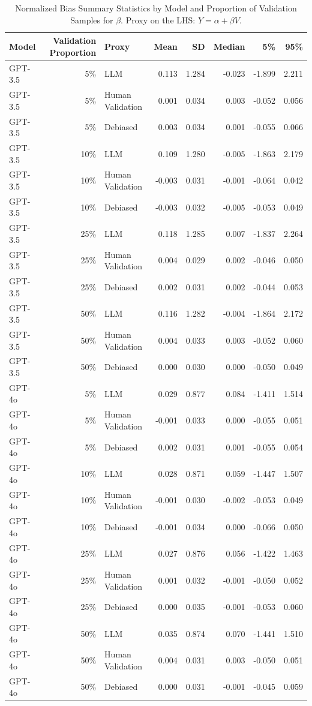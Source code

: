 \begin{table}

\caption{Normalized Bias Summary Statistics by Model and Proportion of Validation Samples for $\beta$. Proxy on the LHS: $Y = \alpha + \beta V$.}
\centering
\begin{tabular}[t]{lrlrrrrr}
\toprule
Model & Validation Proportion & Proxy & Mean & SD & Median & 5\% & 95\%\\
\midrule
GPT-3.5 & 5\% & LLM & 0.113 & 1.284 & -0.023 & -1.899 & 2.211\\
GPT-3.5 & 5\% & Human Validation & 0.001 & 0.034 & 0.003 & -0.052 & 0.056\\
GPT-3.5 & 5\% & Debiased & 0.003 & 0.034 & 0.001 & -0.055 & 0.066\\
GPT-3.5 & 10\% & LLM & 0.109 & 1.280 & -0.005 & -1.863 & 2.179\\
GPT-3.5 & 10\% & Human Validation & -0.003 & 0.031 & -0.001 & -0.064 & 0.042\\
GPT-3.5 & 10\% & Debiased & -0.003 & 0.032 & -0.005 & -0.053 & 0.049\\
GPT-3.5 & 25\% & LLM & 0.118 & 1.285 & 0.007 & -1.837 & 2.264\\
GPT-3.5 & 25\% & Human Validation & 0.004 & 0.029 & 0.002 & -0.046 & 0.050\\
GPT-3.5 & 25\% & Debiased & 0.002 & 0.031 & 0.002 & -0.044 & 0.053\\
GPT-3.5 & 50\% & LLM & 0.116 & 1.282 & -0.004 & -1.864 & 2.172\\
GPT-3.5 & 50\% & Human Validation & 0.004 & 0.033 & 0.003 & -0.052 & 0.060\\
GPT-3.5 & 50\% & Debiased & 0.000 & 0.030 & 0.000 & -0.050 & 0.049\\
GPT-4o & 5\% & LLM & 0.029 & 0.877 & 0.084 & -1.411 & 1.514\\
GPT-4o & 5\% & Human Validation & -0.001 & 0.033 & 0.000 & -0.055 & 0.051\\
GPT-4o & 5\% & Debiased & 0.002 & 0.031 & 0.001 & -0.055 & 0.054\\
GPT-4o & 10\% & LLM & 0.028 & 0.871 & 0.059 & -1.447 & 1.507\\
GPT-4o & 10\% & Human Validation & -0.001 & 0.030 & -0.002 & -0.053 & 0.049\\
GPT-4o & 10\% & Debiased & -0.001 & 0.034 & 0.000 & -0.066 & 0.050\\
GPT-4o & 25\% & LLM & 0.027 & 0.876 & 0.056 & -1.422 & 1.463\\
GPT-4o & 25\% & Human Validation & 0.001 & 0.032 & -0.001 & -0.050 & 0.052\\
GPT-4o & 25\% & Debiased & 0.000 & 0.035 & -0.001 & -0.053 & 0.060\\
GPT-4o & 50\% & LLM & 0.035 & 0.874 & 0.070 & -1.441 & 1.510\\
GPT-4o & 50\% & Human Validation & 0.004 & 0.031 & 0.003 & -0.050 & 0.051\\
GPT-4o & 50\% & Debiased & 0.000 & 0.031 & -0.001 & -0.045 & 0.059\\
\bottomrule
\end{tabular}
\end{table}
